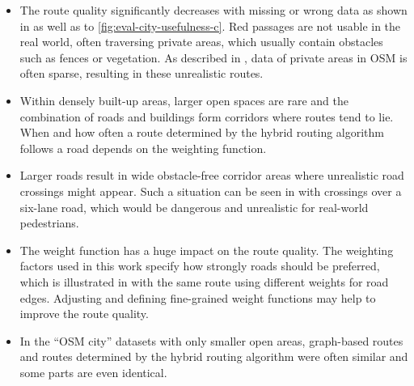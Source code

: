			\begin{itemize}
				\item The route quality significantly decreases with missing or wrong data as shown in  as well as  to \ref{fig:eval-city-usefulness-c}.
				Red passages are not usable in the real world, often traversing private areas, which usually contain obstacles such as fences or vegetation.
				As described in , data of private areas in OSM is often sparse, resulting in these unrealistic routes.
				\item Within densely built-up areas, larger open spaces are rare and the combination of roads and buildings form corridors where routes tend to lie.
				When and how often a route determined by the hybrid routing algorithm follows a road depends on the weighting function.
				\item Larger roads result in wide obstacle-free corridor areas where unrealistic road crossings might appear.
				Such a situation can be seen in  with crossings over a six-lane road, which would be dangerous and unrealistic for real-world pedestrians.
				\item The weight function has a huge impact on the route quality.
				The weighting factors used in this work specify how strongly roads should be preferred, which is illustrated in  with the same route using different weights for road edges.
				Adjusting and defining fine-grained weight functions may help to improve the route quality.
				\item In the \enquote{OSM city} datasets with only smaller open areas, graph-based routes and routes determined by the hybrid routing algorithm were often similar and some parts are even identical.
			\end{itemize}
			
